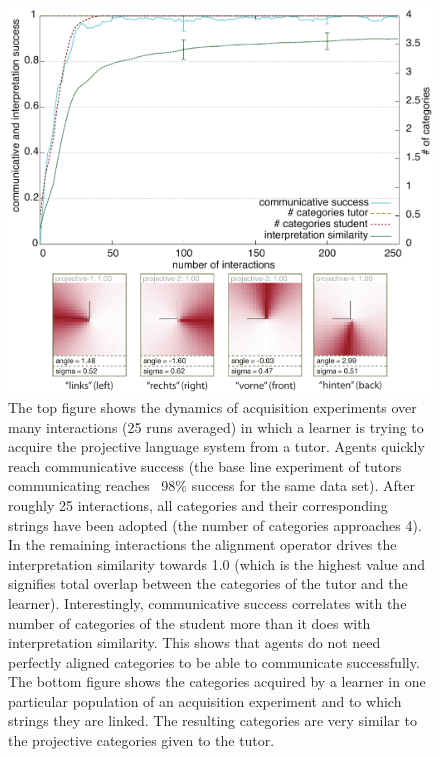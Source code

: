 \begin{figure} 
\begin{center}
\includegraphics[width=0.8\columnwidth]{figs/category-acquisition-projective-results+categories}
\end{center}
\caption[Results acquisition of the projective system]{%
The top figure shows the dynamics of 
acquisition experiments over many interactions (25 runs averaged) in which 
a learner is trying to acquire the projective language system from a tutor.
Agents quickly reach communicative success (the base line experiment of tutors communicating 
reaches ~98\% success for the same data set). After roughly 25 interactions, all categories and their 
corresponding strings have been adopted (the number of categories approaches 4). 
In the remaining interactions the alignment operator drives the {interpretation
similarity} towards 1.0 (which is the highest value and signifies total overlap between the categories
of the tutor and the learner). Interestingly, communicative success correlates
with the number of categories of the student more than it does with interpretation similarity.
This shows that agents do not need perfectly aligned categories to be able to communicate successfully.
The bottom figure shows the categories acquired by a learner in one 
particular population of an acquisition experiment and to which strings they are linked. 
The resulting categories are very similar to the projective categories given to the tutor.}
\label{f:category-acquisition-projective-results}
\end{figure}

